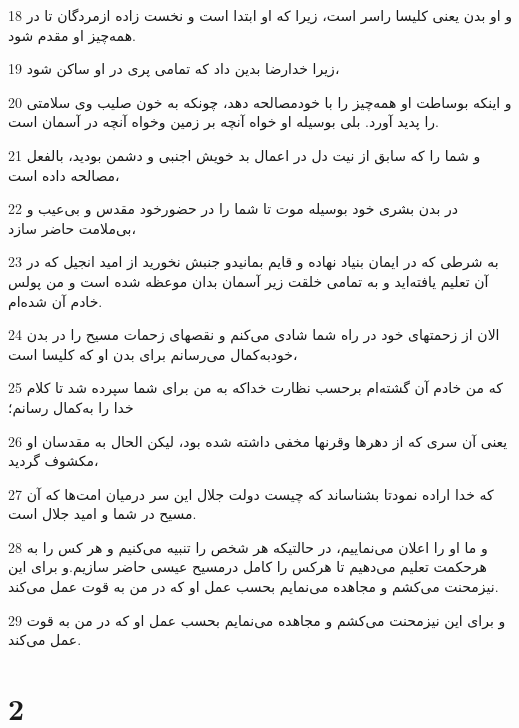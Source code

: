 \par 18 و او بدن یعنی کلیسا راسر است، زیرا که او ابتدا است و نخست زاده ازمردگان تا در همه‌چیز او مقدم شود.
\par 19 زیرا خدارضا بدین داد که تمامی پری در او ساکن شود،
\par 20 و اینکه بوساطت او همه‌چیز را با خودمصالحه دهد، چونکه به خون صلیب وی سلامتی را پدید آورد. بلی بوسیله او خواه آنچه بر زمین وخواه آنچه در آسمان است.
\par 21 و شما را که سابق از نیت دل در اعمال بد خویش اجنبی و دشمن بودید، بالفعل مصالحه داده است،
\par 22 در بدن بشری خود بوسیله موت تا شما را در حضورخود مقدس و بی‌عیب و بی‌ملامت حاضر سازد،
\par 23 به شرطی که در ایمان بنیاد نهاده و قایم بمانیدو جنبش نخورید از امید انجیل که در آن تعلیم یافته‌اید و به تمامی خلقت زیر آسمان بدان موعظه شده است و من پولس خادم آن شده‌ام.
\par 24 الان از زحمتهای خود در راه شما شادی می‌کنم و نقصهای زحمات مسیح را در بدن خودبه‌کمال می‌رسانم برای بدن او که کلیسا است،
\par 25 که من خادم آن گشته‌ام برحسب نظارت خداکه به من برای شما سپرده شد تا کلام خدا را به‌کمال رسانم؛
\par 26 یعنی آن سری که از دهرها وقرنها مخفی داشته شده بود، لیکن الحال به مقدسان او مکشوف گردید،
\par 27 که خدا اراده نمودتا بشناساند که چیست دولت جلال این سر درمیان امت‌ها که آن مسیح در شما و امید جلال است.
\par 28 و ما او را اعلان می‌نماییم، در حالتیکه هر شخص را تنبیه می‌کنیم و هر کس را به هرحکمت تعلیم می‌دهیم تا هرکس را کامل درمسیح عیسی حاضر سازیم.و برای این نیزمحنت می‌کشم و مجاهده می‌نمایم بحسب عمل او که در من به قوت عمل می‌کند.
\par 29 و برای این نیزمحنت می‌کشم و مجاهده می‌نمایم بحسب عمل او که در من به قوت عمل می‌کند.

\chapter{2}

